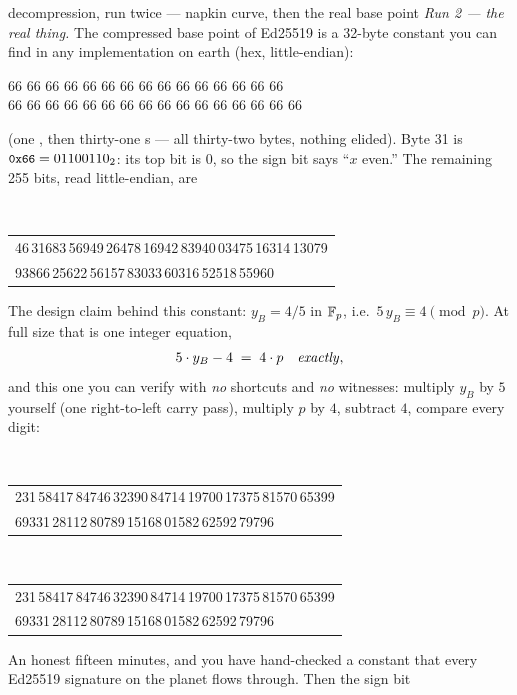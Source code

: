 \begin{worked}{decompression, run twice --- napkin curve, then the real base point}
\emph{Run 2 --- the real thing.} The compressed base point of Ed25519 is
a 32-byte constant you can find in any implementation on earth (hex,
little-endian):
\begin{center}
 66 66 66 66 66 66 66 66 66 66 66 66 66 66 66\\
66 66 66 66 66 66 66 66 66 66 66 66 66 66 66 66
\end{center}
\noindent (one , then thirty-one s --- all thirty-two
bytes, nothing elided).
Byte 31 is $\code{0x66} = 01100110_2$: its top bit is $0$, so the sign
bit says ``$x$ even.'' The remaining 255 bits, read little-endian, are
\par{}\\[-2pt]
{\footnotesize\ttfamily\begin{tabular}{@{}l@{}}46\,31683\,56949\,26478\,16942\,83940\,03475\,16314\,13079\\
93866\,25622\,56157\,83033\,60316\,52518\,55960\end{tabular}}\par\smallskip
The design claim behind this constant: $y_B = 4/5$ in $\mathbb{F}_p$, i.e.\
$5\,y_B \equiv 4 \pmod p$. At full size that is one integer equation,
\[
5 \cdot y_B - 4 \;=\; 4 \cdot p \quad\text{\emph{exactly}},
\]
and this one you can verify with \emph{no} shortcuts and \emph{no}
witnesses: multiply $y_B$ by $5$ yourself (one right-to-left carry pass),
multiply $p$ by $4$, subtract $4$, compare every digit:
\par{}\\[-2pt]
{\footnotesize\ttfamily\begin{tabular}{@{}l@{}}231\,58417\,84746\,32390\,84714\,19700\,17375\,81570\,65399\\
69331\,28112\,80789\,15168\,01582\,62592\,79796\end{tabular}}\par\smallskip
\par\noindent{\footnotesize $4\,p \;=\;\;\;\;\;\;\;$}\\[-2pt]
{\footnotesize\ttfamily\begin{tabular}{@{}l@{}}231\,58417\,84746\,32390\,84714\,19700\,17375\,81570\,65399\\
69331\,28112\,80789\,15168\,01582\,62592\,79796\end{tabular}}\par\smallskip
An honest fifteen minutes, and you have hand-checked a constant that
every Ed25519 signature on the planet flows through. Then the sign bit

\end{worked}
